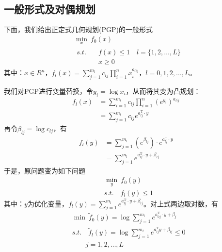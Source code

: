     \subsection{一般形式及对偶规划}
        \par
        下面，我们给出正定式几何规划(PGP)的一般形式
        \begin{align*}
        &\mathop{\min}\limits_{x}\  f_0(x)\\
        &\begin{aligned}
        s.t.\quad &f(x)\leqslant 1\quad l=\{1,2,\ldots,L\}\\
        &x \geqslant 0
        \end{aligned}
        \end{align*}
        其中：$x\in R^n$，$f_l(x)=\mathop{\sum}\limits_{j=1}^{m_l}c_{lj}\mathop{\prod}\limits_{i=1}^{n}x_i^{a_{lij}}$，$l=0,1,2,\ldots,L$。
        \par
        我们对PGP进行变量替换，令$y_i={\log}x_i$，从而将其变为凸规划：
        \begin{align*}
            f_l(x)&=\mathop{\sum}\limits_{i=1}^{m_l}c_{lj}\mathop{\prod}\limits_{i=1}^{n}(e^{y_i})^{a_{lij}}\\
            &=\mathop{\sum}\limits_{j=1}^{m_l}c_{lj}e^{a_{lj}^\mathrm{T} \cdot y}
        \end{align*}
        再令${\beta}_{lj}={\log}c_{lj}$，有
        \begin{align*}
            f_l(y)&=\mathop{\sum}\limits_{j=1}^{m_l}(e^{{\beta}_{lj}})\cdot e^{a_{lj}^\mathrm{T} \cdot y}\\
            &=\mathop{\sum}\limits_{j=1}^{m_l}e^{a_{lj}^\mathrm{T} \cdot y+{\beta}_{lj}}
        \end{align*}
            于是，原问题变为如下问题
        \begin{align*}
            &\mathop{\min}\limits_{y}\  f_0(y)\\
            &s.t.\quad f_l(y)\leqslant 1
            \end{align*}
        其中：$y$为优化变量，$f_l(y)=\mathop{\sum}\limits_{j=1}^{m_l}e^{a_{lj}^\mathrm{T} \cdot y+{\beta}_{lj}}$。对上式两边取对数，有
        \begin{align*}
            &\mathop{\min}\  {{\tilde{f}}_0(y)}={\log}\mathop{\sum}\limits_{j=1}^{m_l}e^{a_{0j}^\mathrm{T} \cdot y+{\beta}_j}\\
            &s.t.\quad {{\tilde{f}}_l(y)}={\log}\mathop{\sum}\limits_{j=1}^{m_l}e^{a_{lj}^\mathrm{T} y +{\beta}_{lj}}\leqslant 0\\
            &\qquad j=1,2,\ldots,L
        \end{align*}
